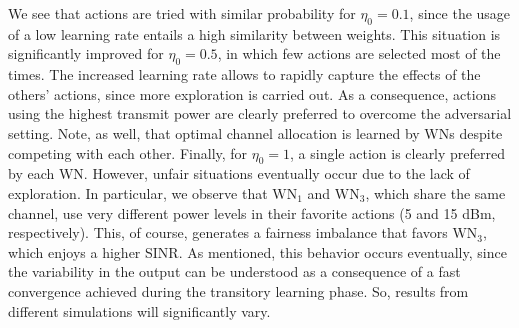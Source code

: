 \documentclass[10pt,journal,compsoc]{IEEEtran}
\begin{document}
	We see that actions are tried with similar probability for $\eta_0 = 0.1$, since the usage of a low learning rate entails a high similarity between weights. This situation is significantly improved for $\eta_0 = 0.5$, in which few actions are selected most of the times. The increased learning rate allows to rapidly capture the effects of the others' actions, since more exploration is carried out. As a consequence, actions using the highest transmit power are clearly preferred to overcome the adversarial setting. Note, as well, that optimal channel allocation is learned by WNs despite competing with each other. Finally, for $\eta_0 = 1$, a single action is clearly preferred by each WN. However, unfair situations eventually occur due to the lack of exploration. In particular, we observe that $\text{WN}_1$ and $\text{WN}_3$, which share the same channel, use very different power levels in their favorite actions (5 and 15 dBm, respectively). This, of course, generates a fairness imbalance that favors $\text{WN}_3$, which enjoys a higher SINR. As mentioned, this behavior occurs eventually, since the variability in the output can be understood as a consequence of a fast convergence achieved during the transitory learning phase. So, results from different simulations will significantly vary.
	
\end{document}
